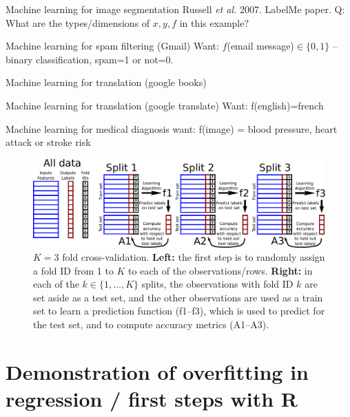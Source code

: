 \documentclass[12pt]{article}
\begin{document}
{Machine learning for image segmentation}
Russell {\it et al.} 2007. LabelMe paper.
Q: What are the types/dimensions of $x,y,f$ in this example?

{Machine learning for spam filtering (Gmail)}
Want: $f$(email message)$\in\{0,1\}$ -- binary classification, spam=1
or not=0.

{Machine learning for translation (google books)}

{Machine learning for translation (google translate)}
Want: f(english)=french

{Machine learning for medical diagnosis}
want: f(image) = blood pressure, heart attack or stroke risk

\begin{figure}
  \centering
  \includegraphics[width=\textwidth]{drawing-cross-validation}
  \caption{$K=3$ fold cross-validation. \textbf{Left:} the first step
    is to randomly assign a fold ID from 1 to $K$ to each of the
    observations/rows. \textbf{Right:} in each of the
    $k\in\{1, \dots, K\}$ splits, the observations with fold ID $k$
    are set aside as a test set, and the other observations are used
    as a train set to learn a prediction function (f1--f3), which is
    used to predict for the test set, and to compute accuracy metrics
    (A1--A3).}
  \label{fig:cross-validation}
\end{figure}

\section{Demonstration of overfitting in regression /
  first steps with R}
\end{document}

